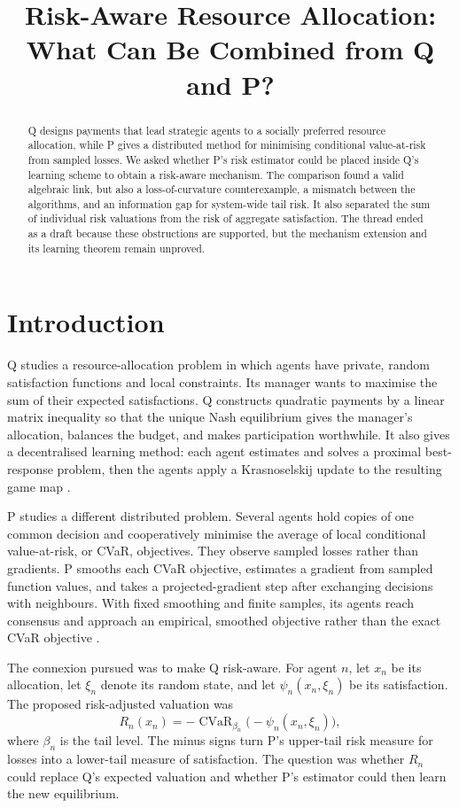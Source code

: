 \documentclass{article}
\title{Risk-Aware Resource Allocation: What Can Be Combined from Q and P?}
\author{}
\date{}
\begin{document}
\maketitle

\begin{abstract}
Q designs payments that lead strategic agents to a socially preferred resource allocation, while P gives a distributed method for minimising conditional value-at-risk from sampled losses. We asked whether P's risk estimator could be placed inside Q's learning scheme to obtain a risk-aware mechanism. The comparison found a valid algebraic link, but also a loss-of-curvature counterexample, a mismatch between the algorithms, and an information gap for system-wide tail risk. It also separated the sum of individual risk valuations from the risk of aggregate satisfaction. The thread ended as a draft because these obstructions are supported, but the mechanism extension and its learning theorem remain unproved.
\end{abstract}

\section{Introduction}

Q studies a resource-allocation problem in which agents have private, random satisfaction functions and local constraints. Its manager wants to maximise the sum of their expected satisfactions. Q constructs quadratic payments by a linear matrix inequality so that the unique Nash equilibrium gives the manager's allocation, balances the budget, and makes participation worthwhile. It also gives a decentralised learning method: each agent estimates and solves a proximal best-response problem, then the agents apply a Krasnoselskij update to the resulting game map \cite{Q}.

P studies a different distributed problem. Several agents hold copies of one common decision and cooperatively minimise the average of local conditional value-at-risk, or CVaR, objectives. They observe sampled losses rather than gradients. P smooths each CVaR objective, estimates a gradient from sampled function values, and takes a projected-gradient step after exchanging decisions with neighbours. With fixed smoothing and finite samples, its agents reach consensus and approach an empirical, smoothed objective rather than the exact CVaR objective \cite{P}.

The connexion pursued was to make Q risk-aware. For agent \(n\), let \(x_n\) be its allocation, let \(\xi_n\) denote its random state, and let \(\psi_n(x_n,\xi_n)\) be its satisfaction. The proposed risk-adjusted valuation was
\[
R_n(x_n)=-\operatorname{CVaR}_{\beta_n}
  \bigl(-\psi_n(x_n,\xi_n)\bigr),
\]
where \(\beta_n\) is the tail level. The minus signs turn P's upper-tail risk measure for losses into a lower-tail measure of satisfaction. The question was whether \(R_n\) could replace Q's expected valuation and whether P's estimator could then learn the new equilibrium.
\end{document}
